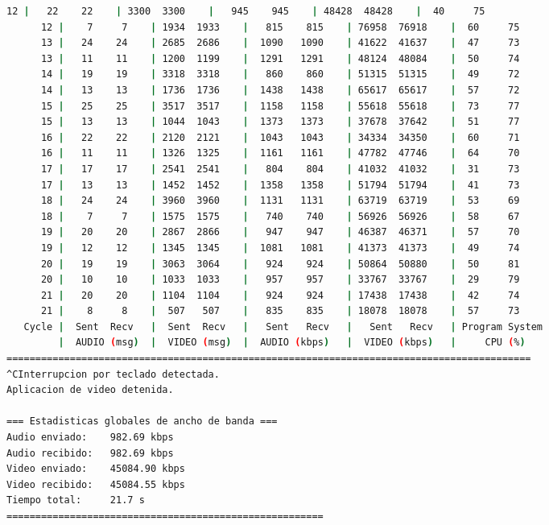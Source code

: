 \begin{adjustbox}{max width=\textwidth}
\begin{lstlisting}[language=bash,basicstyle=\ttfamily\scriptsize]
      12 |   22    22    | 3300  3300    |   945    945    | 48428  48428    |  40     75       
      12 |    7     7    | 1934  1933    |   815    815    | 76958  76918    |  60     75       
      13 |   24    24    | 2685  2686    |  1090   1090    | 41622  41637    |  47     73       
      13 |   11    11    | 1200  1199    |  1291   1291    | 48124  48084    |  50     74       
      14 |   19    19    | 3318  3318    |   860    860    | 51315  51315    |  49     72       
      14 |   13    13    | 1736  1736    |  1438   1438    | 65617  65617    |  57     72       
      15 |   25    25    | 3517  3517    |  1158   1158    | 55618  55618    |  73     77       
      15 |   13    13    | 1044  1043    |  1373   1373    | 37678  37642    |  51     77       
      16 |   22    22    | 2120  2121    |  1043   1043    | 34334  34350    |  60     71       
      16 |   11    11    | 1326  1325    |  1161   1161    | 47782  47746    |  64     70       
      17 |   17    17    | 2541  2541    |   804    804    | 41032  41032    |  31     73       
      17 |   13    13    | 1452  1452    |  1358   1358    | 51794  51794    |  41     73       
      18 |   24    24    | 3960  3960    |  1131   1131    | 63719  63719    |  53     69       
      18 |    7     7    | 1575  1575    |   740    740    | 56926  56926    |  58     67       
      19 |   20    20    | 2867  2866    |   947    947    | 46387  46371    |  57     70       
      19 |   12    12    | 1345  1345    |  1081   1081    | 41373  41373    |  49     74       
      20 |   19    19    | 3063  3064    |   924    924    | 50864  50880    |  50     81       
      20 |   10    10    | 1033  1033    |   957    957    | 33767  33767    |  29     79       
      21 |   20    20    | 1104  1104    |   924    924    | 17438  17438    |  42     74       
      21 |    8     8    |  507   507    |   835    835    | 18078  18078    |  57     73           
   Cycle |  Sent  Recv   |  Sent  Recv   |   Sent   Recv   |   Sent   Recv   | Program System
         |  AUDIO (msg)  |  VIDEO (msg)  |  AUDIO (kbps)   |  VIDEO (kbps)   |     CPU (%) 
===========================================================================================
^CInterrupcion por teclado detectada.
Aplicacion de video detenida.

=== Estadisticas globales de ancho de banda ===
Audio enviado:    982.69 kbps
Audio recibido:   982.69 kbps
Video enviado:    45084.90 kbps
Video recibido:   45084.55 kbps
Tiempo total:     21.7 s
=======================================================
\end{lstlisting}
\end{adjustbox}

